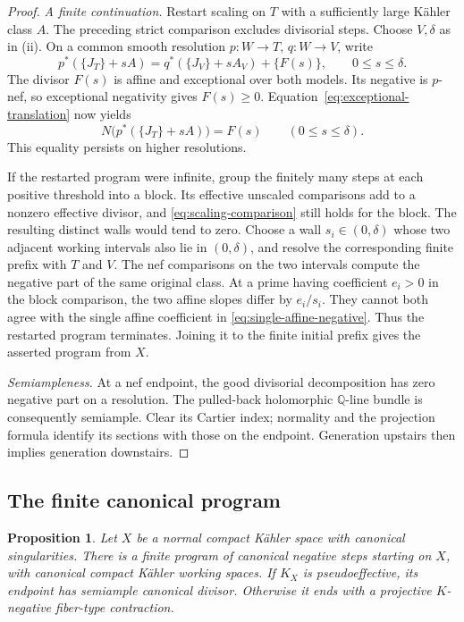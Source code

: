 \documentclass[11pt,a4paper]{article}
\numberwithin{equation}{section}
\newtheorem{proposition}[theorem]{Proposition}
\theoremstyle{definition}
\theoremstyle{remark}
\newcommand{\Q}{\mathbb Q}\newcommand{\R}{\mathbb R}
\begin{document}
\begin{proof}
\smallskip\noindent\emph{A finite continuation.}
Restart scaling on $T$ with a sufficiently large Kähler class $A$.
The preceding strict comparison excludes divisorial steps. Choose
$V,\delta$ as in \textup{(ii)}. On a common smooth resolution
$p:W\to T$, $q:W\to V$, write
\begin{equation}\label{eq:affine-negative-part}
 p^*(\{J_T\}+sA)
 =q^*(\{J_V\}+sA_V)+\{F(s)\},
 \qquad 0\le s\le\delta.
\end{equation}
The divisor $F(s)$ is affine and exceptional over both models.
Its negative is $p$-nef, so exceptional negativity gives $F(s)\ge0$.
Equation~\eqref{eq:exceptional-translation} now yields
\begin{equation}\label{eq:single-affine-negative}
 N\bigl(p^*(\{J_T\}+sA)\bigr)=F(s)
 \qquad(0\le s\le\delta).
\end{equation}
This equality persists on higher resolutions.

If the restarted program were infinite, group the finitely many
steps at each positive threshold into a block. Its effective
unscaled comparisons add to a nonzero effective divisor, and
\eqref{eq:scaling-comparison} still holds for the block. The resulting distinct walls would tend to zero. Choose a
wall $s_i\in(0,\delta)$ whose two adjacent working intervals also
lie in $(0,\delta)$, and resolve the corresponding finite prefix
with $T$ and $V$. The nef comparisons on the two intervals compute
the negative part of the same original class. At a prime having
coefficient $e_i>0$ in the block comparison, the two affine slopes
differ by $e_i/s_i$. They cannot both agree with the single affine
coefficient in \eqref{eq:single-affine-negative}. Thus the
restarted program terminates. Joining it to the finite initial
prefix gives the asserted program from $X$.

\smallskip\noindent\emph{Semiampleness.}
At a nef endpoint, the good divisorial decomposition has zero
negative part on a resolution. The pulled-back holomorphic
$\Q$-line bundle is consequently semiample. Clear its Cartier index; normality
and the projection formula identify its sections with those on the
endpoint. Generation upstairs then implies generation downstairs.
\end{proof}

\subsection{The finite canonical program}

\begin{proposition}\label{prop:canonical-finite}
Let $X$ be a normal compact Kähler space with canonical singularities.
There is a finite program of canonical negative steps starting on
$X$, with canonical compact Kähler working spaces. If $K_X$ is
pseudoeffective, its endpoint has semiample canonical divisor.
Otherwise it ends with a projective $K$-negative fiber-type contraction.
\end{proposition}
\end{document}
